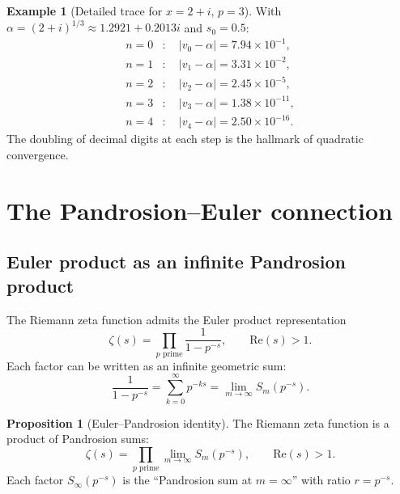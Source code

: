 \documentclass[11pt,a4paper]{article}
\theoremstyle{definition}
\newtheorem{proposition}{Proposition}[section]
\newtheorem{example}{Example}[section]
\begin{document}
\begin{example}[Detailed trace for $x = 2+i$, $p = 3$]
With $\alpha = (2+i)^{1/3} \approx 1.2921 + 0.2013i$ and $s_0 = 0.5$:
\begin{align*}
  n=0&: \quad |v_0 - \alpha| = 7.94 \times 10^{-1}, \\
  n=1&: \quad |v_1 - \alpha| = 3.31 \times 10^{-2}, \\
  n=2&: \quad |v_2 - \alpha| = 2.45 \times 10^{-5}, \\
  n=3&: \quad |v_3 - \alpha| = 1.38 \times 10^{-11}, \\
  n=4&: \quad |v_4 - \alpha| = 2.50 \times 10^{-16}.
\end{align*}
The doubling of decimal digits at each step is the hallmark of quadratic convergence.
\end{example}

\section{The Pandrosion--Euler connection}
\label{sec:euler}

\subsection{Euler product as an infinite Pandrosion product}

The Riemann zeta function admits the Euler product representation
\begin{equation}
  \label{eq:euler_product}
  \zeta(s) = \prod_{p \text{ prime}} \frac{1}{1 - p^{-s}},
  \qquad \mathrm{Re}(s) > 1.
\end{equation}
Each factor can be written as an infinite geometric sum:
\[
  \frac{1}{1 - p^{-s}} = \sum_{k=0}^{\infty} p^{-ks} = \lim_{m \to \infty} S_m(p^{-s}).
\]

\begin{proposition}[Euler--Pandrosion identity]
\label{prop:euler_pandrosion}
The Riemann zeta function is a product of Pandrosion sums:
\begin{equation}
  \label{eq:euler_pandrosion}
  \zeta(s) = \prod_{p \text{ prime}} \lim_{m \to \infty} S_m(p^{-s}),
  \qquad \mathrm{Re}(s) > 1.
\end{equation}
Each factor $S_\infty(p^{-s})$ is the ``Pandrosion sum at $m = \infty$'' with ratio $r = p^{-s}$.
\end{proposition}
\end{document}
